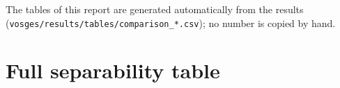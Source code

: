\documentclass[11pt,a4paper]{article}
\begin{document}
The tables of this report are generated automatically from the results
(\texttt{vosges/results/tables/comparison\_*.csv}); no number is copied by hand.

\section{Full separability table}


\end{document}
